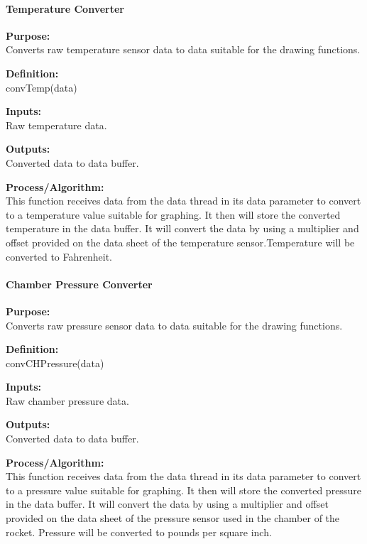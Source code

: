 \documentclass[10pt,draftclsnofoot,onecolumn,retainorgcmds]{IEEEtran}
\begin{document}
\paragraph{Temperature Converter}
{\bf Purpose:} \\
Converts raw temperature sensor data to data suitable for the drawing functions.  \par
{\bf Definition:} \\ 
convTemp(data) \par
{\bf Inputs:} \\ Raw temperature data. \par
{\bf Outputs:} \\ Converted data to data buffer. \par
{\bf Process/Algorithm:} \\
This function receives data from the data thread in its data parameter to convert to a temperature value suitable for graphing. It then will store the converted temperature in the data buffer. It will convert the data by using a multiplier and offset provided on the data sheet of the temperature sensor.Temperature will be converted to Fahrenheit. \par

\paragraph{Chamber Pressure Converter}
{\bf Purpose:} \\
Converts raw pressure sensor data to data suitable for the drawing functions.  \par
{\bf Definition:} \\ 
convCHPressure(data) \par
{\bf Inputs:} \\ Raw chamber pressure data. \par
{\bf Outputs:} \\ Converted data to data buffer. \par
{\bf Process/Algorithm:} \\
This function receives data from the data thread in its data parameter to convert to a pressure value suitable for graphing. It then will store the converted pressure in the data buffer. It will convert the data by using a multiplier and offset provided on the data sheet of the pressure sensor used in the chamber of the rocket. Pressure will be converted to pounds per square inch. \par
\end{document}
